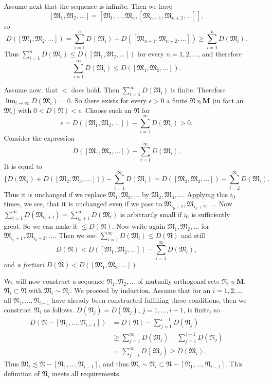 \documentclass[12pt,b5paper,twoside]{article}
\newcommand{\M}{\mathbf M}
\begin{document}
Assume next that the sequence is infinite. Then we have
\[
 [\mathfrak M_1,\mathfrak M_2,\ldots]
 =[\mathfrak M_1,\ldots,\mathfrak M_n,
   [\mathfrak M_{n+1},\mathfrak M_{n+2},\ldots]],
\]
so
\[
 D([\mathfrak M_1,\mathfrak M_2,\ldots])
 =\sum_{i=1}^nD(\mathfrak M_i)
 +D([\mathfrak M_{n+1},\mathfrak M_{n+2},\ldots])
 \geq\sum_{i=1}^nD(\mathfrak M_i).
\]
Thus
$\sum_{i=1}^nD(\mathfrak M_i)\leq D([\mathfrak M_1,\mathfrak M_2,\ldots])$
for every $n=1,2,\ldots$, and therefore
\[
 \sum_{i=1}^\infty D(\mathfrak M_i)
 \leq D([\mathfrak M_1,\mathfrak M_2,\ldots]).
\]

Assume now, that $<$ does hold. Then $\sum_{i=1}^\infty D(\mathfrak M_i)$ is
finite. Therefore $\lim_{i\to\infty}D(\mathfrak M_i)=0$. So there exists for
every $\epsilon>0$ a finite $\mathfrak N\mathbin\eta\M$ (in fact an
$\mathfrak M_i$) with $0<D(\mathfrak N)<\epsilon$. Choose such an
$\mathfrak N$ for
\[
 \epsilon=D([\mathfrak M_1,\mathfrak M_2,\ldots])
 -\sum_{i=1}^\infty D(\mathfrak M_i)>0.
\]
Consider the expression
\[
 D([\mathfrak M_1,\mathfrak M_2,\ldots])
 -\sum_{i=1}^\infty D(\mathfrak M_i).
\]
It is equal to
\[
 \{D(\mathfrak M_1)+D([\mathfrak M_2,\mathfrak M_3,\ldots])\}
 -\sum_{i=1}^\infty D(\mathfrak M_i)
 =D([\mathfrak M_2,\mathfrak M_3,\ldots])
 -\sum_{i=2}^\infty D(\mathfrak M_i).
\]
Thus it is unchanged if we replace
$\mathfrak M_1,\mathfrak M_2,\ldots$ by
$\mathfrak M_2,\mathfrak M_3,\ldots$. Applying this $i_0$ times, we see, that
it is unchanged even if we pass to
$\mathfrak M_{i_0+1},\mathfrak M_{i_0+2},\ldots$. Now
$\sum_{i=1}^\infty D(\mathfrak M_{i_0+i})=
\sum_{i_0+1}^\infty D(\mathfrak M_i)$ is arbitrarily small if $i_0$ is
sufficiently great. So we can make it $\leq D(\mathfrak N)$. Now write again
$\mathfrak M_1,\mathfrak M_2,\ldots$ for
$\mathfrak M_{i_0+1},\mathfrak M_{i_0+2},\ldots$. Then we see:
$\sum_{i=1}^\infty D(\mathfrak M_i)\leq D(\mathfrak N)$ and still
\[
 D(\mathfrak N)<D([\mathfrak M_1,\mathfrak M_2,\ldots])
 -\sum_{i=1}^\infty D(\mathfrak M_i),
\]
and \emph{a fortiori}
$D(\mathfrak N)<D([\mathfrak M_1,\mathfrak M_2,\ldots])$.

We will now construct a sequence $\mathfrak N_1,\mathfrak N_2,\ldots$ of
mutually orthogonal sets $\mathfrak N_i\mathbin\eta\M$,
$\mathfrak N_i\subset\mathfrak N$ with $\mathfrak M_i\sim\mathfrak N_i$. We
proceed by induction. Assume that for an $i=1,2,\ldots$ all
$\mathfrak N_1,\ldots,\mathfrak N_{i-1}$ have already been constructed
fulfilling these conditions, then we construct $\mathfrak N_i$ as follows.
$D(\mathfrak N_j)=D(\mathfrak M_j)$, $j=1,\ldots,i-1$, is finite, so
\[
\begin{aligned}
 D(\mathfrak N-[\mathfrak N_1,\ldots,\mathfrak N_{i-1}])
 &=D(\mathfrak N)-\sum_{j=1}^{i-1}D(\mathfrak N_j)\\
 &\geq\sum_{j=1}^\infty D(\mathfrak M_j)
       -\sum_{j=1}^{i-1}D(\mathfrak N_j)\\
 &=\sum_{j=i}^\infty D(\mathfrak M_j)
 \geq D(\mathfrak M_i).
\end{aligned}
\]
Thus
$\mathfrak M_i\precsim
\mathfrak N-[\mathfrak N_1,\ldots,\mathfrak N_{i-1}]$, and thus
$\mathfrak M_i\sim\mathfrak N_i\subset
\mathfrak N-[\mathfrak N_1,\ldots,\mathfrak N_{i-1}]$. This definition of
$\mathfrak N_i$ meets all requirements.
\end{document}
